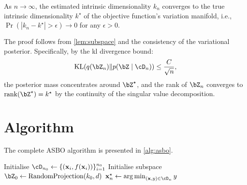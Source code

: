 \begin{corollarybox}[title=Dimensionality Adaptation, label=cor:dimensionality]
\label{cor:dimensionality}
As $n \to \infty$, the estimated intrinsic dimensionality $k_n$ converges to the
true intrinsic dimensionality $k^\star$ of the objective function's variation
manifold, i.e., $\Pr(|k_n - k^\star| > \epsilon) \to 0$ for any $\epsilon > 0$.
\end{corollarybox}

\begin{proofbox}
The proof follows from \cref{lem:subspace} and the consistency of the
variational posterior.  Specifically, by the \gls{kl} divergence bound:
\begin{equation}
    \KL(q(\bZ_n) \| p(\bZ \mid \cD_n)) \leq \frac{C}{\sqrt{n}},
    \label{eq:kl-bound}
\end{equation}
the posterior mass concentrates around $\bZ^\star$, and the rank of $\bZ_n$
converges to $\rank(\bZ^\star) = k^\star$ by the continuity of the singular
value decomposition.
\end{proofbox}

\section{Algorithm}
\label{sec:algorithm}

The complete ASBO algorithm is presented in \cref{alg:asbo}.

\begin{algorithm2e}[htbp]
\caption{Adaptive Subspace Bayesian Optimisation (ASBO)}
\label{alg:asbo}
Initialise $\cD_{n_0} \leftarrow \{(\bx_i, f(\bx_i))\}_{i=1}^{n_0}$\;
Initialise subspace $\bZ_0 \leftarrow \text{RandomProjection}(k_0, d)$\;
\Return $\bx_n^\star \leftarrow \argmin_{(\bx, y) \in \cD_n} y$\;
\end{algorithm2e}
